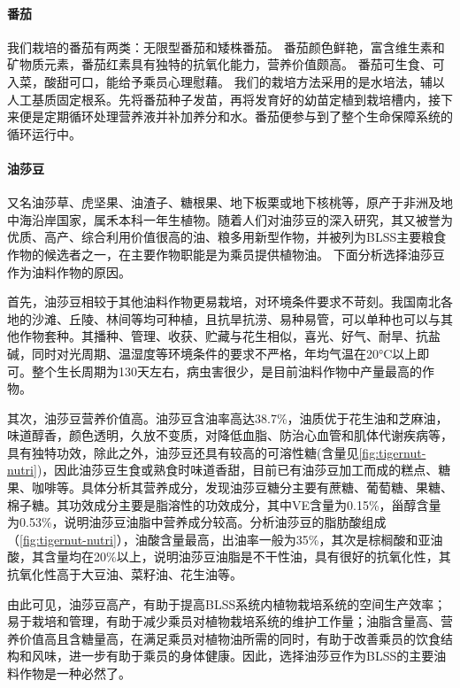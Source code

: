 \paragraph{番茄}

我们栽培的番茄有两类：无限型番茄和矮株番茄。
番茄颜色鲜艳，富含维生素和矿物质元素，番茄红素具有独特的抗氧化能力，营养价值颇高。
番茄可生食、可入菜，酸甜可口，能给予乘员心理慰藉。
我们的栽培方法采用的是水培法，辅以人工基质固定根系。先将番茄种子发苗，再将发育好的幼苗定植到栽培槽内，接下来便是定期循环处理营养液并补加养分和水。番茄便参与到了整个生命保障系统的循环运行中。

\paragraph{油莎豆}

又名油莎草、虎坚果、油渣子、糖根果、地下板栗或地下核桃等，原产于非洲及地中海沿岸国家，属禾本科一年生植物。随着人们对油莎豆的深入研究，其又被誉为优质、高产、综合利用价值很高的油、粮多用新型作物，并被列为BLSS主要粮食作物的候选者之一，在主要作物职能是为乘员提供植物油。
下面分析选择油莎豆作为油料作物的原因。

首先，油莎豆相较于其他油料作物更易栽培，对环境条件要求不苛刻。我国南北各地的沙滩、丘陵、林间等均可种植，且抗旱抗涝、易种易管，可以单种也可以与其他作物套种。其播种、管理、收获、贮藏与花生相似，喜光、好气、耐旱、抗盐碱，同时对光周期、温湿度等环境条件的要求不严格，年均气温在20\si{\degreeCelsius}以上即可。整个生长周期为130天左右，病虫害很少，是目前油料作物中产量最高的作物。

其次，油莎豆营养价值高。油莎豆含油率高达38.7\%，油质优于花生油和芝麻油，味道醇香，颜色透明，久放不变质，对降低血脂、防治心血管和肌体代谢疾病等，具有独特功效，除此之外，油莎豆还具有较高的可溶性糖(含量见\cref{fig:tigernut-nutri})，因此油莎豆生食或熟食时味道香甜，目前已有油莎豆加工而成的糕点、糖果、咖啡等。具体分析其营养成分，发现油莎豆糖分主要有蔗糖、葡萄糖、果糖、棉子糖。其功效成分主要是脂溶性的功效成分，其中VE含量为0.15\%，甾醇含量为0.53\%，说明油莎豆油脂中营养成分较高。分析油莎豆的脂肪酸组成（\cref{fig:tigernut-nutri}），油酸含量最高，出油率一般为35\%，其次是棕榈酸和亚油酸，其含量均在20\%以上，说明油莎豆油脂是不干性油，具有很好的抗氧化性，其抗氧化性高于大豆油、菜籽油、花生油等。

由此可见，油莎豆高产，有助于提高BLSS系统内植物栽培系统的空间生产效率；易于栽培和管理，有助于减少乘员对植物栽培系统的维护工作量；油脂含量高、营养价值高且含糖量高，在满足乘员对植物油所需的同时，有助于改善乘员的饮食结构和风味，进一步有助于乘员的身体健康。因此，选择油莎豆作为BLSS的主要油料作物是一种必然了。

